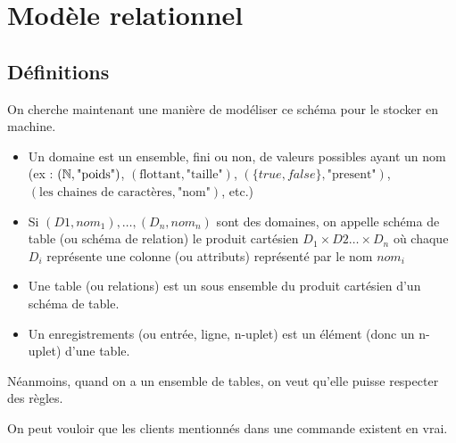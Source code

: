 \section{Modèle relationnel}

\subsection{Définitions}

On cherche maintenant une manière de modéliser ce schéma pour le stocker en machine.

\begin{definition}
	\begin{itemize}[label=$\star$]
		\item Un domaine est un ensemble, fini ou non, de valeurs possibles ayant un nom (ex : $(\mathbb{N}, \text{"poids"})$, $(\text{flottant}, \text{"taille"})$, $(\{true, false\}, \text{"present"})$, $(\text{les chaines de caractères}, \text{"nom"})$, etc.)
	
		\item Si $(D1, nom_1), \dots, (D_n, nom_n)$ sont des domaines, on appelle schéma de table (ou schéma de relation) le produit cartésien $D_1 \times D2 \dots \times D_n$ où chaque $D_i$ représente une colonne (ou attributs) représenté par le nom $nom_i$
	
		\item Une table (ou relations) est un sous ensemble du produit cartésien d'un schéma de table.
	
		\item Un enregistrements (ou entrée, ligne, n-uplet) est un élément (donc un n-uplet) d'une table.
	\end{itemize}
\end{definition}

\begin{idee}
	Néanmoins, quand on a un ensemble de tables, on veut qu'elle puisse respecter des règles.
\end{idee}

\begin{example}
	On peut vouloir que les clients mentionnés dans une commande existent en vrai.
\end{example}

